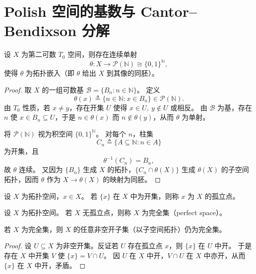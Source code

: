 \documentclass[lang=cn,a4paper,newtx,figureplace=section,tableplace=section]{elegantbook}
\begin{document}
\section{Polish 空间的基数与 Cantor--Bendixson 分解}

\begin{lemma}\label{lem:second-countable-embedding}
  设 $X$ 为第二可数 $T_0$ 空间，则存在连续单射
  \[
    \theta:X\to\mathcal{P}(\mathbb{N})\cong\{0,1\}^{\mathbb{N}},
  \]
  使得 $\theta$ 为拓扑嵌入（即 $\theta$ 给出 $X$ 到其像的同胚）。
\end{lemma}
\begin{proof}
  取 $X$ 的一组可数基 $\mathcal{B}=\{B_n:n\in\mathbb{N}\}$。
  定义
  \[
    \theta(x)\triangleq\{n\in\mathbb{N}: x\in B_n\}\in\mathcal{P}(\mathbb{N}).
  \]
  由 $T_0$ 性质，若 $x\ne y$，存在开集 $U$ 使得 $x\in U,\ y\notin U$ 或相反。
  由 $\mathcal{B}$ 为基，存在 $n$ 使 $x\in B_n\subseteq U$，于是 $n\in\theta(x)$ 而 $n\notin\theta(y)$，从而 $\theta$ 为单射。

  将 $\mathcal{P}(\mathbb{N})$ 视为积空间 $\{0,1\}^{\mathbb{N}}$。
  对每个 $n$，柱集
  \[
    C_n\triangleq\{A\subseteq\mathbb{N}: n\in A\}
  \]
  为开集，且
  \[
    \theta^{-1}(C_n)=B_n,
  \]
  故 $\theta$ 连续。
  又因为 $\{B_n\}$ 生成 $X$ 的拓扑，$\{C_n\cap\theta(X)\}$ 生成 $\theta(X)$ 的子空间拓扑，因而 $\theta$ 作为 $X\to\theta(X)$ 的映射为同胚。
\end{proof}

\begin{definition}[孤立点]
  设 $X$ 为拓扑空间，$x\in X$。
  若 $\{x\}$ 在 $X$ 中为开集，则称 $x$ 为 $X$ 的孤立点。
\end{definition}

\begin{definition}[完全集]
  设 $X$ 为拓扑空间。
  若 $X$ 无孤立点，则称 $X$ 为完全集（perfect space）。
\end{definition}

\begin{proposition}\label{prop:perfect-open-subset}
  若 $X$ 为完全集，则 $X$ 的任意非空开子集（以子空间拓扑）仍为完全集。
\end{proposition}
\begin{proof}
  设 $U\subseteq X$ 为非空开集。反证若 $U$ 存在孤立点 $x$，则 $\{x\}$ 在 $U$ 中开。
  于是存在 $X$ 中开集 $V$ 使 $\{x\}=V\cap U$。
  因 $U$ 在 $X$ 中开，$V\cap U$ 在 $X$ 中亦开，从而 $\{x\}$ 在 $X$ 中开，矛盾。
\end{proof}
\end{document}
